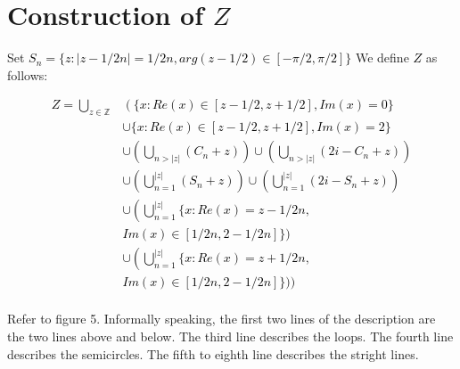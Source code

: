 \documentclass[twocolumn]{article}
\begin{document}
\section{Construction of $Z$}
Set \textcolor{black}{$S_n=\{z:|z-1/2n|=1/2n,arg(z-1/2)\in[-\pi/2,\pi/2]\}$}
We define \textcolor{black}{$Z$} as follows:
\begin{footnotesize}
    \textcolor{black}{
    \begin{align*}
      Z=\bigcup_{z\in\mathbb{Z}}&\left(\{x:Re(x)\in[z-1/2,z+1/2],Im(x)=0\}\right.\\
	  &\cup\{x:Re(x)\in[z-1/2,z+1/2],Im(x)=2\}\\
      &\cup\left(\bigcup_{n>|z|}(C_n+z)\right)\cup\left(\bigcup_{n>|z|}(2i-C_n+z)\right)\\
      &\cup\left(\bigcup_{n=1}^{|z|}(S_n+z)\right)\cup\left(\bigcup_{n=1}^{|z|}(2i-S_n+z)\right)\\
      &\cup\left(\bigcup_{n=1}^{|z|}\{x:Re(x)=z-1/2n,\right.\\
	  & Im(x)\in[1/2n,2-1/2n]\})\\
      &\cup\left(\bigcup_{n=1}^{|z|}\{x:Re(x)=z+1/2n,\right.\\
	  & Im(x)\in[1/2n,2-1/2n]\}))\\
    \end{align*}}
\end{footnotesize}
Refer to figure 5. Informally speaking, the first two lines of the description are the two lines above and below. The third line describes the loops. The fourth line describes the semicircles. The fifth to eighth line describes the stright lines.
\end{document}
